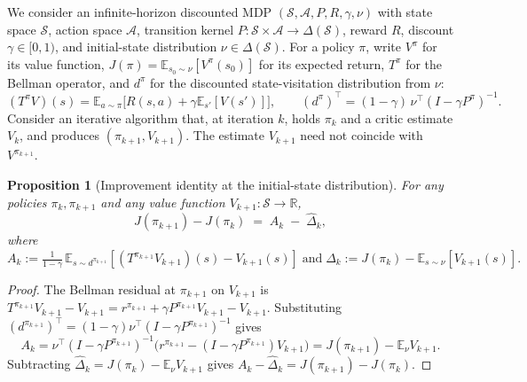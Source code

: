 \documentclass{article}
\newtheorem{proposition}{Proposition}
\begin{document}
We consider an infinite-horizon discounted MDP $(\mathcal{S}, \mathcal{A}, P, R, \gamma, \nu)$ with state space $\mathcal{S}$, action space $\mathcal{A}$, transition kernel $P : \mathcal{S} \times \mathcal{A} \to \Delta(\mathcal{S})$, reward $R$, discount $\gamma \in [0, 1)$, and initial-state distribution $\nu \in \Delta(\mathcal{S})$. For a policy $\pi$, write $V^\pi$ for its value function, $J(\pi) = \mathbb{E}_{s_0 \sim \nu}[V^\pi(s_0)]$ for its expected return, $T^\pi$ for the Bellman operator, and $d^\pi$ for the discounted state-visitation distribution from $\nu$:
\begin{equation*}
(T^\pi V)(s) = \mathbb{E}_{a \sim \pi}\!\big[R(s,a) + \gamma \mathbb{E}_{s'}[V(s')]\big], \qquad
(d^\pi)^\top = (1-\gamma) \,\nu^\top (I - \gamma P^\pi)^{-1}.
\end{equation*}
Consider an iterative algorithm that, at iteration $k$, holds $\pi_k$ and a critic estimate $V_k$, and produces $(\pi_{k+1}, V_{k+1})$. The estimate $V_{k+1}$ need not coincide with $V^{\pi_{k+1}}$.

\begin{proposition}[Improvement identity at the initial-state distribution]
\label{prop:identity}
For any policies $\pi_k, \pi_{k+1}$ and any value function $V_{k+1} : \mathcal{S} \to \mathbb{R}$,
\begin{equation}
\label{eq:identity}
J(\pi_{k+1}) - J(\pi_k) \;=\; A_k \;-\; \hat\Delta_k,
\end{equation}
where
\begin{equation}
\label{eq:Ak-dhat}
A_k := \tfrac{1}{1-\gamma}\, \mathbb{E}_{s \sim d^{\pi_{k+1}}}\!\left[(T^{\pi_{k+1}} V_{k+1})(s) - V_{k+1}(s)\right]
\;\text{and}\;
\hat\Delta_k := J(\pi_k) - \mathbb{E}_{s \sim \nu}[V_{k+1}(s)].
\end{equation}
\end{proposition}

\begin{proof}
The Bellman residual at $\pi_{k+1}$ on $V_{k+1}$ is $T^{\pi_{k+1}} V_{k+1} - V_{k+1} = r^{\pi_{k+1}} + \gamma P^{\pi_{k+1}} V_{k+1} - V_{k+1}$. Substituting $(d^{\pi_{k+1}})^\top = (1-\gamma) \nu^\top (I - \gamma P^{\pi_{k+1}})^{-1}$ gives
\begin{equation*}
A_k
= \nu^\top (I - \gamma P^{\pi_{k+1}})^{-1} \big(r^{\pi_{k+1}} - (I - \gamma P^{\pi_{k+1}}) V_{k+1}\big)
= J(\pi_{k+1}) - \mathbb{E}_\nu V_{k+1}.
\end{equation*}
Subtracting $\hat\Delta_k = J(\pi_k) - \mathbb{E}_\nu V_{k+1}$ gives $A_k - \hat\Delta_k = J(\pi_{k+1}) - J(\pi_k)$.
\end{proof}
\end{document}
